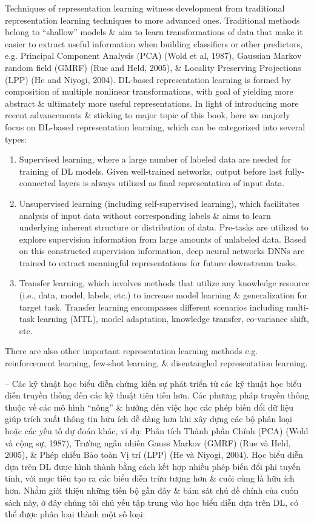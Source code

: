 \documentclass{article}
\begin{document}
\begin{itemize}
\begin{itemize}
        Techniques of representation learning witness development from traditional representation learning techniques to more advanced ones. Traditional methods belong to ``shallow'' models \& aim to learn transformations of data that make it easier to extract useful information when building classifiers or other predictors, e.g. Principal Component Analysis (PCA) (Wold et al, 1987), Gaussian Markov random field (GMRF) (Rue and Held, 2005), \& Locality Preserving Projections (LPP) (He and Niyogi, 2004). DL-based representation learning is formed by composition of multiple nonlinear transformations, with goal of yielding more abstract \& ultimately more useful representations. In light of introducing more recent advancements \& sticking to major topic of this book, here we majorly focus on DL-based representation learning, which can be categorized into several types:
        \begin{enumerate}
            \item Supervised learning, where a large number of labeled data are needed for training of DL models. Given well-trained networks, output before last fully-connected layers is always utilized as final representation of input data.
            \item Unsupervised learning (including self-supervised learning), which facilitates analysis of input data without corresponding labels \& aims to learn underlying inherent structure or distribution of data. Pre-tasks are utilized to explore supervision information from large amounts of unlabeled data. Based on this constructed supervision information, deep neural networks DNNs are trained to extract meaningful representations for future downstream tasks.
            \item Transfer learning, which involves methods that utilize any knowledge resource (i.e., data, model, labels, etc.) to increase model learning \& generalization for target task. Transfer learning encompasses different scenarios including multi-task learning (MTL), model adaptation, knowledge transfer, co-variance shift, etc.
        \end{enumerate}
        There are also other important representation learning methods e.g. reinforcement learning, few-shot learning, \& disentangled representation learning.

        -- Các kỹ thuật học biểu diễn chứng kiến sự phát triển từ các kỹ thuật học biểu diễn truyền thống đến các kỹ thuật tiên tiến hơn. Các phương pháp truyền thống thuộc về các mô hình ``nông'' \& hướng đến việc học các phép biến đổi dữ liệu giúp trích xuất thông tin hữu ích dễ dàng hơn khi xây dựng các bộ phân loại hoặc các yếu tố dự đoán khác, ví dụ: Phân tích Thành phần Chính (PCA) (Wold và cộng sự, 1987), Trường ngẫu nhiên Gauss Markov (GMRF) (Rue và Held, 2005), \& Phép chiếu Bảo toàn Vị trí (LPP) (He và Niyogi, 2004). Học biểu diễn dựa trên DL được hình thành bằng cách kết hợp nhiều phép biến đổi phi tuyến tính, với mục tiêu tạo ra các biểu diễn trừu tượng hơn \& cuối cùng là hữu ích hơn. Nhằm giới thiệu những tiến bộ gần đây \& bám sát chủ đề chính của cuốn sách này, ở đây chúng tôi chủ yếu tập trung vào học biểu diễn dựa trên DL, có thể được phân loại thành một số loại:


\end{itemize}
\end{itemize}
\end{document}
